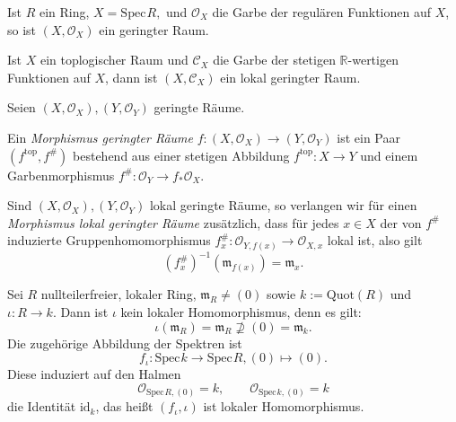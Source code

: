 \documentclass[11pt]{book}
\theoremstyle{nonumberbreak}
\newenvironment{defin}[1][]{\ifthenelse{\equal{#1}{}}{\definition}{\definition[#1]}\rm}{\enddefinition}
\newenvironment{ex}[1][]{\ifthenelse{\equal{#1}{}}{\example}{\example[#1]}\rm}{\endexample}
\newcommand{\spec}{\mathrm{Spec} \hspace{1pt} }
\begin{document}
\begin{spacing}{1.4}
\begin{ex}
\begin{compactenum}
\item Ist $R$ ein Ring, $X= \spec R,$ und $\mathcal{O}_X$ die Garbe der regulären Funktionen auf $X$, so ist $\left(X, \mathcal{O}_X \right)$ ein geringter Raum.
\item Ist $X$ ein toplogischer Raum und $\mathcal{C}_X$ die Garbe der stetigen $\mathbb{R}$-wertigen Funktionen auf $X$, dann ist $\left(X, \mathcal{C}_X\right)$ ein lokal geringter Raum.
\end{compactenum}
\end{ex}

\begin{defin} %

Seien $\left(X, \mathcal{O}_X \right), \left(Y, \mathcal{O}_Y \right)$ geringte Räume.
\begin{compactenum}
\item Ein \textit{Morphismus geringter Räume} $f: \left(X, \mathcal{O}_X\right) \longrightarrow \left(Y, \mathcal{O}_Y\right)$ ist ein Paar $\left( f^{\textrm{top}}, f^{\#} \right)$ bestehend aus einer stetigen Abbildung $f^{\textrm{top}}: X \longrightarrow Y$ und einem Garbenmorphismus $f^{\#}: \mathcal{O}_Y \longrightarrow f_* \mathcal{O}_X$.
\item Sind $\left(X, \mathcal{O}_X\right), \left(Y, \mathcal{O}_Y\right)$ lokal geringte Räume, so verlangen wir für einen \textit{Morphismus lokal geringter Räume} zusätzlich, dass für jedes $x \in X$ der von $f^\#$ induzierte Gruppenhomomorphismus $f_x^{\#}: \mathcal{O}_{Y, f(x)} \longrightarrow \mathcal{O}_{X,x}$ lokal ist, also gilt
$$\left(f_x^{\#}\right)^{-1} \left(\mathfrak{m}_{f(x)}\right) = \mathfrak{m}_x.$$
\end{compactenum}
\end{defin}


\begin{ex}
Sei $R$ nullteilerfreier, lokaler Ring, $\mathfrak{m}_R \neq ( 0 )$ sowie $k:= \textrm{Quot}(R)$ und $\iota: R \longrightarrow k$. Dann ist $\iota$ kein lokaler Homomorphismus, denn es gilt:
$$\iota(\mathfrak{m}_R) = \mathfrak{m}_R \nsupseteq ( 0 )  = \mathfrak{m}_{k}.$$
Die zugehörige Abbildung der Spektren ist
$$f_{\iota}: \spec k \longrightarrow \spec R, ( 0 ) \mapsto ( 0 ).$$
Diese induziert auf den Halmen
$$\mathcal{O}_{\spec R, ( 0 ) } = k, \qquad \mathcal{O}_{\spec k, (0) } = k$$
die Identität $\textrm{id}_{k}$, das heißt $(f_{\iota}, \iota)$ ist lokaler Homomorphismus.
\end{ex}




\end{spacing}
\end{document}

